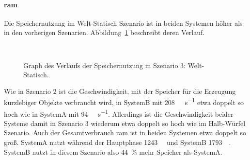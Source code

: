 \paragraph{\ac{ram}}
Die Speichernutzung im Welt-Statisch Szenario ist in beiden Systemen höher als in den vorherigen Szenarien. Abbildung~\ref{fig:seed-0-static-mem} beschreibt deren Verlauf. 
\begin{figure}[!htbp]
	\\
	\caption{Graph des Verlaufs der Speichernutzung in Szenario 3: Welt-Statisch.}\label{fig:seed-0-static-mem}
\end{figure} 
Wie in Szenario 2 ist die Geschwindigkeit, mit der Speicher für die Erzeugung kurzlebiger Objekte verbraucht wird, in SystemB mit \SI{208}{\mega\byte\per\second} etwa doppelt so hoch wie in SystemA mit \SI{94}{\mega\byte\per\second}. Allerdings ist die Geschwindigkeit beider Systeme damit in Szenario 3 wiederum etwa doppelt so hoch wie im Halb-Würfel Szenario.
Auch der Gesamtverbrauch \ac{ram} ist in beiden Systemen etwa doppelt so groß. SystemA nutzt während der Hauptphase \SI{1243}{\mega\byte} und SystemB \SI{1793}{\mega\byte}. SystemB nutzt in diesem Szenario also \SI{44}{\percent} mehr Speicher als SystemA.   